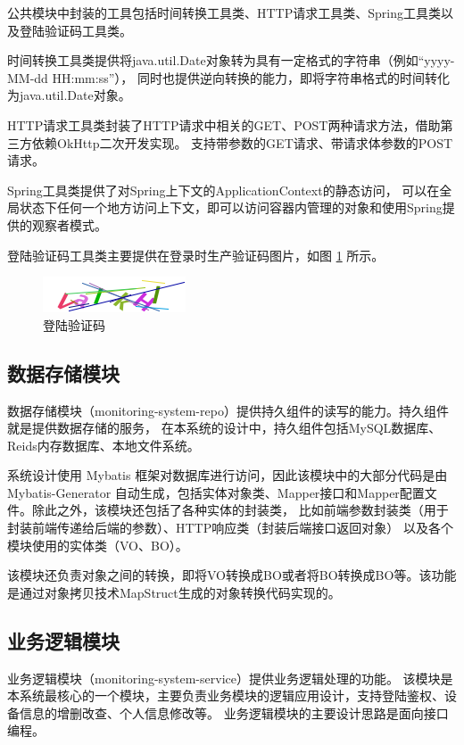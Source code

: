 公共模块中封装的工具包括时间转换工具类、HTTP请求工具类、Spring工具类以及登陆验证码工具类。

时间转换工具类提供将java.util.Date对象转为具有一定格式的字符串（例如“yyyy-MM-dd HH:mm:ss”），
同时也提供逆向转换的能力，即将字符串格式的时间转化为java.util.Date对象。

HTTP请求工具类封装了HTTP请求中相关的GET、POST两种请求方法，借助第三方依赖OkHttp二次开发实现。
支持带参数的GET请求、带请求体参数的POST请求。

Spring工具类提供了对Spring上下文的ApplicationContext的静态访问，
可以在全局状态下任何一个地方访问上下文，即可以访问容器内管理的对象和使用Spring提供的观察者模式。


\newpage
登陆验证码工具类主要提供在登录时生产验证码图片，如图 \ref{Fig:code} 所示。

\begin{figure}[ht]
    \centering
    \includegraphics[width=0.5\linewidth]{./Figure/IMG_code.png}
    \caption{登陆验证码}\label{Fig:code}
\end{figure}

\subsection{数据存储模块}
数据存储模块（monitoring-system-repo）提供持久组件的读写的能力。持久组件就是提供数据存储的服务，
在本系统的设计中，持久组件包括MySQL数据库、Reids内存数据库、本地文件系统。

系统设计使用 Mybatis 框架对数据库进行访问，因此该模块中的大部分代码是由 Mybatis-Generator\cite{MyBatis}
自动生成，包括实体对象类、Mapper接口和Mapper配置文件。除此之外，该模块还包括了各种实体的封装类，
比如前端参数封装类（用于封装前端传递给后端的参数）、HTTP响应类（封装后端接口返回对象）
以及各个模块使用的实体类（VO、BO）。

该模块还负责对象之间的转换，即将VO转换成BO或者将BO转换成BO等。该功能是通过对象拷贝技术MapStruct生成的对象转换代码实现的。

\subsection{业务逻辑模块}
业务逻辑模块（monitoring-system-service）提供业务逻辑处理的功能。
该模块是本系统最核心的一个模块，主要负责业务模块的逻辑应用设计，支持登陆鉴权、设备信息的增删改查、个人信息修改等。
业务逻辑模块的主要设计思路是面向接口编程。

